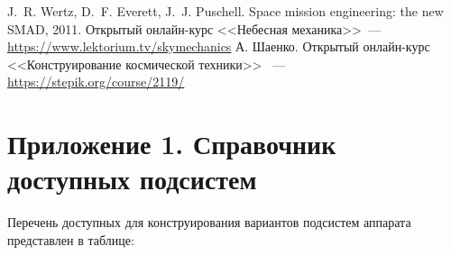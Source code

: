 \documentclass[12pt,a4paper]{article}
\begin{document}
\begin{thebibliography}{2}
 J.~R. Wertz, D.~F. Everett, J.~J. Puschell. Space mission
engineering: the new SMAD, 2011.
 Открытый онлайн-курс <<Небесная механика>>~---
  \url{https://www.lektorium.tv/skymechanics}
 А. Шаенко. Открытый онлайн-курс <<Конструирование космической техники>> ~---
  \url{https://stepik.org/course/2119/}
\end{thebibliography}

\section*{Приложение 1. Справочник доступных подсистем}
\label{Sec:Subsystems}

Перечень доступных для конструирования вариантов подсистем аппарата представлен в таблице:
\end{document}
